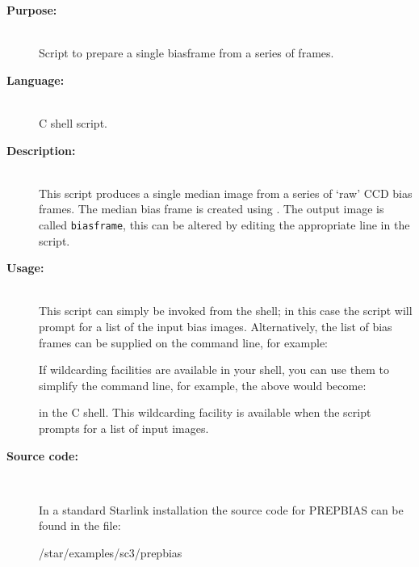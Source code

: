 \documentclass[twoside,11pt]{starlink}
\begin{document}
\begin{description}

\item [\textbf{Purpose:}] \mbox{} \\
     Script to prepare a single biasframe from a series of frames.

\item [\textbf{Language:}] \mbox{} \\
     C shell script.

\item [\textbf{Description:}] \mbox{} \\
     This script produces a single median image from a series of
     `raw' CCD bias frames.  The median bias frame is created using
      .  The output
     image is called \verb+biasframe+, this can be altered by editing
     the appropriate line in the script.

\item [\textbf{Usage:}] \mbox{} \\
     This script can simply be invoked from the shell; in this case
     the script will prompt for a list of the input bias images.
     Alternatively, the list of bias frames can be supplied on the
     command line, for example:

\begin{terminalv}
\end{terminalv}

     If wildcarding facilities are available in your shell, you can use
     them to simplify the command line, for example, the above would
     become:

\begin{terminalv}
\end{terminalv}

     in the C shell.  This wildcarding facility is available when the
     script prompts for a list of input images.

\item [\textbf{Source code:}] \mbox{} \\
\begin{latexonly}
In a standard Starlink installation the source code for PREPBIAS can be found
in the file:
\begin{terminalv}
   /star/examples/sc3/prepbias
\end{terminalv}
\end{latexonly}




\end{description}
\end{document}
